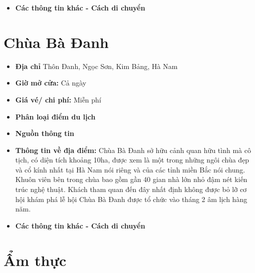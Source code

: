 \documentclass{article}
\begin{document}
\begin{itemize}
    \item{\textbf{Các thông tin khác - Cách di chuyển}} 
\end{itemize}

\section{Chùa Bà Đanh}
\begin{itemize}
    \item{\textbf{Địa chỉ}} Thôn Đanh, Ngọc Sơn, Kim Bảng, Hà Nam

    \item{\textbf{Giờ mở cửa:}} Cả ngày

    \item{\textbf{Giá vé/ chi phí:}} Miễn phí

    \item{\textbf{Phân loại điểm du lịch}} 

    \item{\textbf{Nguồn thông tin}} 

    \item{\textbf{Thông tin về địa điểm:}} Chùa Bà Đanh sở hữu cảnh quan hữu tình mà cô tịch, có diện tích khoảng 10ha, được xem là một trong những ngôi chùa đẹp và cổ kính nhất tại Hà Nam nói riêng và của các tỉnh miền Bắc nói chung. Khuôn viên bên trong chùa bao gồm gần 40 gian nhà lớn nhỏ đậm nét kiến trúc nghệ thuật. Khách tham quan đến đây nhất định không được bỏ lỡ cơ hội khám phá lễ hội Chùa Bà Đanh được tổ chức vào tháng 2 âm lịch hàng năm.
\end{itemize}

\begin{itemize}
    \item{\textbf{Các thông tin khác - Cách di chuyển}} 
\end{itemize}


\newpage
\section*{{Ẩm thực}}
\setcounter{section}{0}
\end{document}
